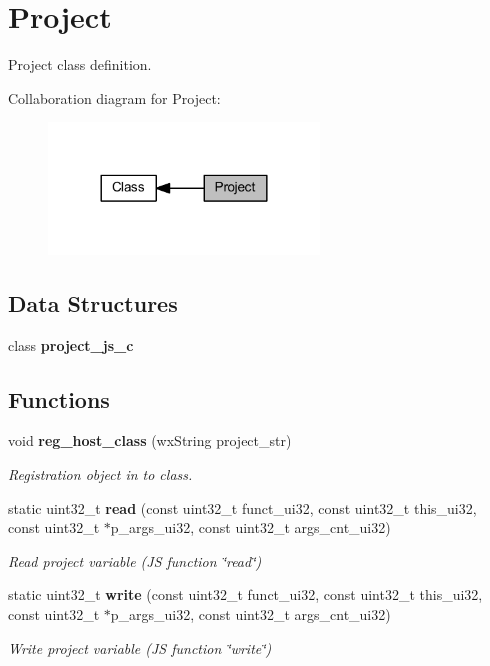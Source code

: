 \section{Project}
\label{group___project}


Project class definition.  


Collaboration diagram for Project\+:
\nopagebreak
\begin{figure}[H]
\begin{center}
\leavevmode
\includegraphics[width=204pt]{group___project}
\end{center}
\end{figure}
\subsection*{Data Structures}
\begin{DoxyCompactItemize}
\item 
class \textbf{ project\+\_\+js\+\_\+c}
\end{DoxyCompactItemize}
\subsection*{Functions}
\begin{DoxyCompactItemize}
\item 
void \textbf{ reg\+\_\+host\+\_\+class} (wx\+String project\+\_\+str)
\begin{DoxyCompactList}\small\item\em Registration object in to class. \end{DoxyCompactList}\item 
static uint32\+\_\+t \textbf{ read} (const uint32\+\_\+t funct\+\_\+ui32, const uint32\+\_\+t this\+\_\+ui32, const uint32\+\_\+t $\ast$p\+\_\+args\+\_\+ui32, const uint32\+\_\+t args\+\_\+cnt\+\_\+ui32)
\begin{DoxyCompactList}\small\item\em Read project variable (JS function \char`\"{}read\char`\"{}) \end{DoxyCompactList}\item 
static uint32\+\_\+t \textbf{ write} (const uint32\+\_\+t funct\+\_\+ui32, const uint32\+\_\+t this\+\_\+ui32, const uint32\+\_\+t $\ast$p\+\_\+args\+\_\+ui32, const uint32\+\_\+t args\+\_\+cnt\+\_\+ui32)
\begin{DoxyCompactList}\small\item\em Write project variable (JS function \char`\"{}write\char`\"{}) \end{DoxyCompactList}\end{DoxyCompactItemize}


